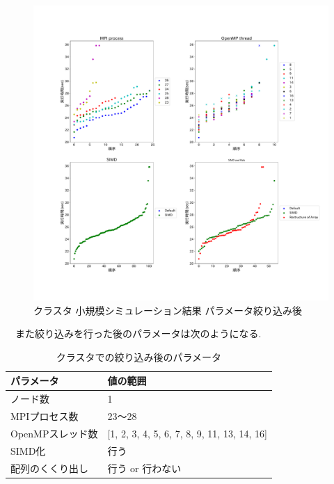\begin{figure}[htb]
\begin{center}
    \includegraphics[width=14cm]{./images/cluster-bench-adjusted-final.pdf}
    \caption{クラスタ 小規模シミュレーション結果 パラメータ絞り込み後}
    \label{fig:cluster-bench-adjusted-final}
\end{center}
\end{figure}
\clearpage
　また絞り込みを行った後のパラメータは次のようになる.\\
\begin{table}[htb]
  \caption {クラスタでの絞り込み後のパラメータ}
  \begin{center}
    \begin{tabular}{|p{6cm}|p{8cm}|}
      \hline
      パラメータ & 値の範囲\\ \hline
      ノード数 & 1\\ \hline
      MPIプロセス数 & 23〜28\\ \hline
      OpenMPスレッド数 & [1, 2, 3, 4, 5, 6, 7, 8, 9, 11, 13, 14, 16]\\ \hline
      SIMD化 & 行う\\ \hline
      配列のくくり出し & 行う or 行わない\\ \hline
    \end{tabular}
  \end{center}
\end{table}

